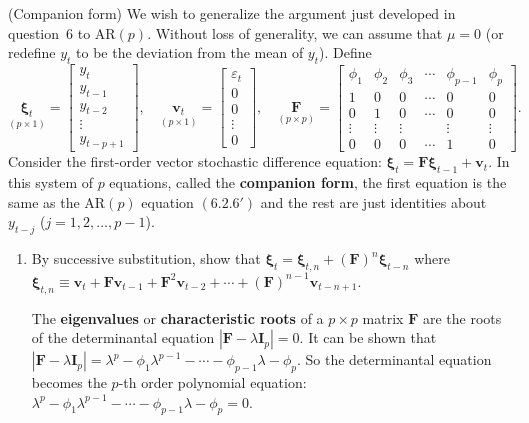 \begin{problemset}
\exercise[7] (Companion form) \; We wish to generalize the argument just developed in
question~6 to $\text{AR}(p)$. Without loss of generality, we can assume that $\mu = 0$ (or
redefine $y_t$ to be the deviation from the mean of $y_t$). Define
\[
  \underset{(p \times 1)}{\bm{\xi}_t} =
  \begin{bmatrix} y_t \\ y_{t-1} \\ y_{t-2} \\ \vdots \\ y_{t-p+1} \end{bmatrix}, \quad
  \underset{(p \times 1)}{\mathbf{v}_t} =
  \begin{bmatrix} \varepsilon_t \\ 0 \\ 0 \\ \vdots \\ 0 \end{bmatrix}, \quad
  \underset{(p \times p)}{\mathbf{F}} =
  \begin{bmatrix}
    \phi_1 & \phi_2 & \phi_3 & \cdots & \phi_{p-1} & \phi_p \\
    1 & 0 & 0 & \cdots & 0 & 0 \\
    0 & 1 & 0 & \cdots & 0 & 0 \\
    \vdots & \vdots & \vdots & & \vdots & \vdots \\
    0 & 0 & 0 & \cdots & 1 & 0
  \end{bmatrix}.
\]
Consider the first-order vector stochastic difference equation: $\bm{\xi}_t = \mathbf{F}\bm{\xi}_{t-1} + \mathbf{v}_t$.
In this system of $p$ equations, called the \textbf{companion form}, the first equation
is the same as the $\text{AR}(p)$ equation $(6.2.6')$ and the rest are just
identities about $y_{t-j}$ ($j = 1, 2, \ldots, p-1$).

\begin{enumerate}[label=(\alph*)]
\item By successive substitution, show that
$\bm{\xi}_t = \bm{\xi}_{t,n} + (\mathbf{F})^n \bm{\xi}_{t-n}$
where $\bm{\xi}_{t,n} \equiv \mathbf{v}_t + \mathbf{F}\mathbf{v}_{t-1} + \mathbf{F}^2 \mathbf{v}_{t-2} + \cdots + (\mathbf{F})^{n-1}\mathbf{v}_{t-n+1}$.

The \textbf{eigenvalues} or \textbf{characteristic roots} of a $p \times p$ matrix $\mathbf{F}$ are the roots
of the determinantal equation $|\mathbf{F} - \lambda \mathbf{I}_p| = 0$.
It can be shown that $|\mathbf{F} - \lambda \mathbf{I}_p| = \lambda^p - \phi_1 \lambda^{p-1} - \cdots - \phi_{p-1}\lambda - \phi_p$.
So the determinantal equation becomes the $p$-th order polynomial equation:
$\lambda^p - \phi_1 \lambda^{p-1} - \cdots - \phi_{p-1}\lambda - \phi_p = 0$.


\end{enumerate}
\end{problemset}
